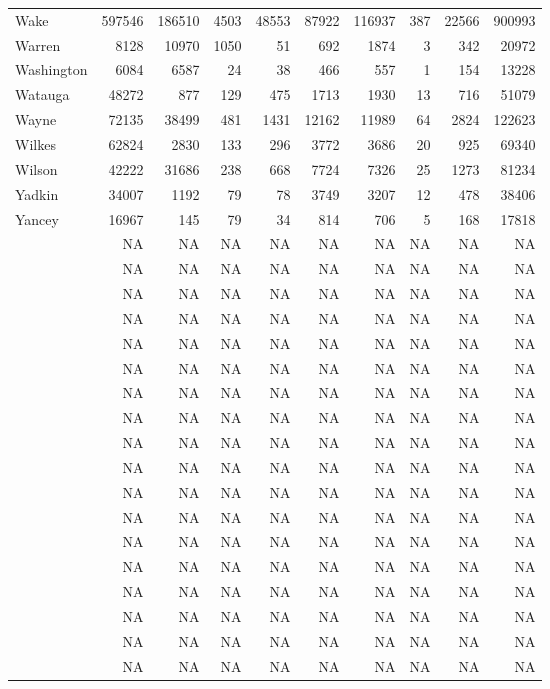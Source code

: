 \documentclass[12pt,]{article}
\begin{document}
\begin{tabular}{lrrrrrrrrr}
Wake & 597546 & 186510 & 4503 & 48553 & 87922 & 116937 & 387 & 22566 & 900993\\
Warren & 8128 & 10970 & 1050 & 51 & 692 & 1874 & 3 & 342 & 20972\\
Washington & 6084 & 6587 & 24 & 38 & 466 & 557 & 1 & 154 & 13228\\
Watauga & 48272 & 877 & 129 & 475 & 1713 & 1930 & 13 & 716 & 51079\\
\addlinespace
Wayne & 72135 & 38499 & 481 & 1431 & 12162 & 11989 & 64 & 2824 & 122623\\
Wilkes & 62824 & 2830 & 133 & 296 & 3772 & 3686 & 20 & 925 & 69340\\
Wilson & 42222 & 31686 & 238 & 668 & 7724 & 7326 & 25 & 1273 & 81234\\
Yadkin & 34007 & 1192 & 79 & 78 & 3749 & 3207 & 12 & 478 & 38406\\
Yancey & 16967 & 145 & 79 & 34 & 814 & 706 & 5 & 168 & 17818\\
\addlinespace
 & NA & NA & NA & NA & NA & NA & NA & NA & NA\\
 & NA & NA & NA & NA & NA & NA & NA & NA & NA\\
 & NA & NA & NA & NA & NA & NA & NA & NA & NA\\
 & NA & NA & NA & NA & NA & NA & NA & NA & NA\\
 & NA & NA & NA & NA & NA & NA & NA & NA & NA\\
\addlinespace
 & NA & NA & NA & NA & NA & NA & NA & NA & NA\\
 & NA & NA & NA & NA & NA & NA & NA & NA & NA\\
 & NA & NA & NA & NA & NA & NA & NA & NA & NA\\
 & NA & NA & NA & NA & NA & NA & NA & NA & NA\\
 & NA & NA & NA & NA & NA & NA & NA & NA & NA\\
\addlinespace
 & NA & NA & NA & NA & NA & NA & NA & NA & NA\\
 & NA & NA & NA & NA & NA & NA & NA & NA & NA\\
 & NA & NA & NA & NA & NA & NA & NA & NA & NA\\
 & NA & NA & NA & NA & NA & NA & NA & NA & NA\\
 & NA & NA & NA & NA & NA & NA & NA & NA & NA\\
\addlinespace
 & NA & NA & NA & NA & NA & NA & NA & NA & NA\\
 & NA & NA & NA & NA & NA & NA & NA & NA & NA\\
 & NA & NA & NA & NA & NA & NA & NA & NA & NA\\

\end{tabular}
\end{document}
